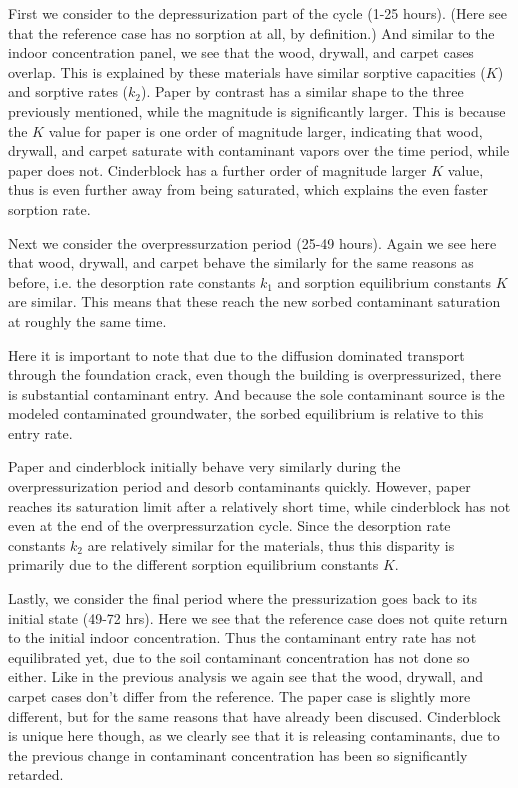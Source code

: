 First we consider to the depressurization part of the cycle (1-25 hours).
(Here see that the reference case has no sorption at all, by definition.)
And similar to the indoor concentration panel, we see that the wood, drywall, and carpet cases overlap.
This is explained by these materials have similar sorptive capacities ($K$) and sorptive rates ($k_2$).
Paper by contrast has a similar shape to the three previously mentioned, while the magnitude is significantly larger.
This is because the $K$ value for paper is one order of magnitude larger, indicating that wood, drywall, and carpet saturate with contaminant vapors over the time period, while paper does not.
Cinderblock has a further order of magnitude larger $K$ value, thus is even further away from being saturated, which explains the even faster sorption rate.\par

Next we consider the overpressurzation period (25-49 hours).
Again we see here that wood, drywall, and carpet behave the similarly for the same reasons as before, i.e. the desorption rate constants $k_1$ and sorption equilibrium constants $K$ are similar.
This means that these reach the new sorbed contaminant saturation at roughly the same time.\par

Here it is important to note that due to the diffusion dominated transport through the foundation crack, even though the building is overpressurized, there is substantial contaminant entry.
And because the sole contaminant source is the modeled contaminated groundwater, the sorbed equilibrium is relative to this entry rate.\par

Paper and cinderblock initially behave very similarly during the overpressurization period and desorb contaminants quickly.
However, paper reaches its saturation limit after a relatively short time, while cinderblock has not even at the end of the overpressurzation cycle.
Since the desorption rate constants $k_2$ are relatively similar for the materials, thus this disparity is primarily due to the different sorption equilibrium constants $K$.\par

Lastly, we consider the final period where the pressurization goes back to its initial state (49-72 hrs).
Here we see that the reference case does not quite return to the initial indoor concentration.
Thus the contaminant entry rate has not equilibrated yet, due to the soil contaminant concentration has not done so either.
Like in the previous analysis we again see that the wood, drywall, and carpet cases don't differ from the reference.
The paper case is slightly more different, but for the same reasons that have already been discused.
Cinderblock is unique here though, as we clearly see that it is releasing contaminants, due to the previous change in contaminant concentration has been so significantly retarded.\par



